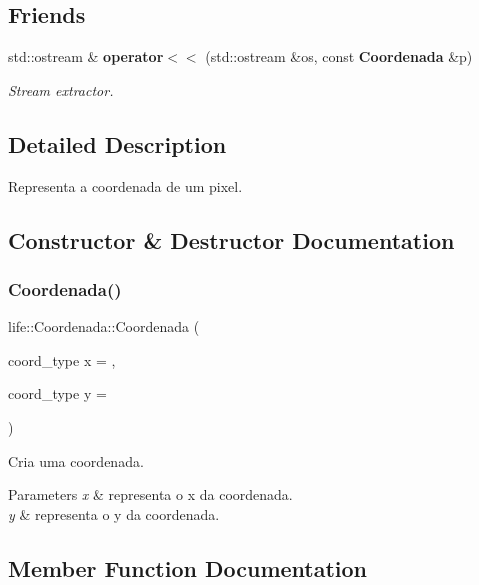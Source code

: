 \subsection*{Friends}
\begin{DoxyCompactItemize}
\item 
\mbox{\label{classlife_1_1_coordenada_a05e1b26bc1a6790bbd7e439aeced9c96}} 
std\+::ostream \& \textbf{ operator$<$$<$} (std\+::ostream \&os, const \textbf{ Coordenada} \&p)
\begin{DoxyCompactList}\small\item\em Stream extractor. \end{DoxyCompactList}\end{DoxyCompactItemize}


\subsection{Detailed Description}
Representa a coordenada de um pixel. 

\subsection{Constructor \& Destructor Documentation}
\mbox{\label{classlife_1_1_coordenada_ab3882150b7434bc5cded41ce66e1e9aa}} 
\subsubsection{Coordenada()}
{\footnotesize\ttfamily life\+::\+Coordenada\+::\+Coordenada (\begin{DoxyParamCaption}\item[{coord\+\_\+type}]{x = {},  }\item[{coord\+\_\+type}]{y = {} }\end{DoxyParamCaption})\hspace{0.3cm}{\ttfamily [inline]}}

Cria uma coordenada. 
\begin{DoxyParams}{Parameters}
{\em x} & representa o x da coordenada. \\
\hline
{\em y} & representa o y da coordenada. \\
\hline
\end{DoxyParams}


\subsection{Member Function Documentation}
\mbox{\label{classlife_1_1_coordenada_af10876c5a390bed633c43018f9ee1b73}} 
